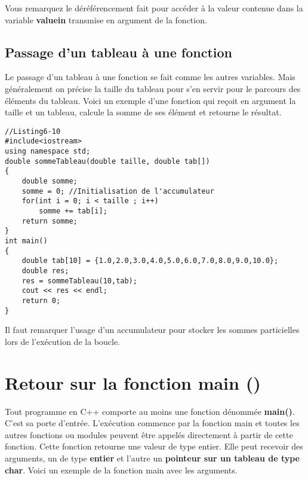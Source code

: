\documentclass[a4paper, oneside,11pt]{book}
\begin{document}
Vous remarquez le d\'er\'ef\'erencement fait pour acc\'eder \`a la valeur contenue dans la variable \textbf{valuein} transmise en argument 
de la fonction.

\subsection{Passage d'un tableau \`a une fonction}

Le passage d'un tableau \`a une fonction se fait comme les autres variables. Mais g\'en\'eralement on pr\'ecise la taille du tableau pour s'en servir pour le parcours des \'el\'ements
du tableau. Voici un exemple d'une fonction qui re\c{c}oit en argument la taille et un tableau, calcule la somme de ses \'el\'ement et retourne le r\'esultat.

\begin{lstlisting}
//Listing6-10
#include<iostream>
using namespace std;
double sommeTableau(double taille, double tab[])
{
    double somme;
    somme = 0; //Initialisation de l'accumulateur
    for(int i = 0; i < taille ; i++)
        somme += tab[i];
    return somme;
}
int main()
{
    double tab[10] = {1.0,2.0,3.0,4.0,5.0,6.0,7.0,8.0,9.0,10.0};
    double res;
    res = sommeTableau(10,tab);
    cout << res << endl;
    return 0;
}
\end{lstlisting}

Il faut remarquer l'usage d'un accumulateur pour stocker les sommes particielles lors 
de l'ex\'ecution de la boucle.

\section{Retour sur la fonction main ()}

Tout programme en C++ comporte au moins une fonction d\'enomm\'ee \textbf{main()}.
C'est sa porte d'entr\'ee. L'ex\'ecution commence par la fonction main et toutes 
les autres fonctions ou modules peuvent \^etre appel\'es directement \`a partir 
de cette fonction. Cette fonction retourne une valeur de type entier. Elle peut 
recevoir des arguments, un de type \textbf{entier} et l'autre un \textbf{pointeur 
sur un tableau de type char}. Voici un exemple de la fonction main avec les arguments.
\end{document}
